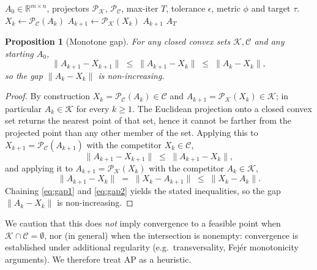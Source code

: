 \documentclass[journal]{IEEEtran}
\newtheorem{proposition}[theorem]{Proposition}
\newcommand{\R}{\mathbb{R}}
\newcommand{\proj}{\mathcal{P}}
\newcommand{\Kset}{\mathcal{K}}
\newcommand{\Cset}{\mathcal{C}}
\begin{document}
\begin{algorithm}[t]
\caption{Alternating projection for $\Kset \cap \Cset$.}\label{alg:AP}
\begin{algorithmic}[1]
\Require $A_0 \in \R^{m\times n}$, projectors
$\proj_\Kset$, $\proj_\Cset$, max-iter $T$, tolerance $\epsilon$,
metric $\phi$ and target $\tau$.
  \State $X_k \gets \proj_\Cset(A_k)$
  \State $A_{k+1} \gets \proj_\Kset(X_k)$
    \State \Return $A_{k+1}$ 
  \EndIf
\EndFor
\State \Return $A_T$ 
\end{algorithmic}
\end{algorithm}

\begin{proposition}[Monotone gap]\label{prop:gap}
For any closed convex sets $\Kset, \Cset$ and any starting $A_0$,
\[
\|A_{k+1} - X_{k+1}\| \;\le\; \|A_{k+1} - X_k\| \;\le\; \|A_k - X_k\|,
\]
so the gap $\|A_k - X_k\|$ is non-increasing.
\end{proposition}

\begin{proof}
By construction $X_k = \proj_\Cset(A_k) \in \Cset$ and
$A_{k+1} = \proj_\Kset(X_k) \in \Kset$; in particular $A_k \in \Kset$ for
every $k \ge 1$. The Euclidean projection onto a closed convex set
returns the nearest point of that set, hence it cannot be farther from
the projected point than any other member of the set. Applying this to
$X_{k+1} = \proj_\Cset(A_{k+1})$ with the competitor $X_k \in \Cset$,
\begin{equation}\label{eq:gap1}
\|A_{k+1} - X_{k+1}\| \;\le\; \|A_{k+1} - X_k\|,
\end{equation}
and applying it to $A_{k+1} = \proj_\Kset(X_k)$ with the competitor
$A_k \in \Kset$,
\begin{equation}\label{eq:gap2}
\|A_{k+1} - X_k\| \;=\; \|X_k - A_{k+1}\| \;\le\; \|X_k - A_k\|.
\end{equation}
Chaining \eqref{eq:gap1} and \eqref{eq:gap2} yields the stated
inequalities, so the gap $\|A_k - X_k\|$ is non-increasing.
\end{proof}

We caution that this does \emph{not}
imply convergence to a feasible point when $\Kset \cap \Cset = \emptyset$,
nor (in general) when the intersection is nonempty: convergence is
established under additional regularity (e.g.\ transversality,
Fej\'er monotonicity arguments). We therefore treat AP as a heuristic.
\end{document}
